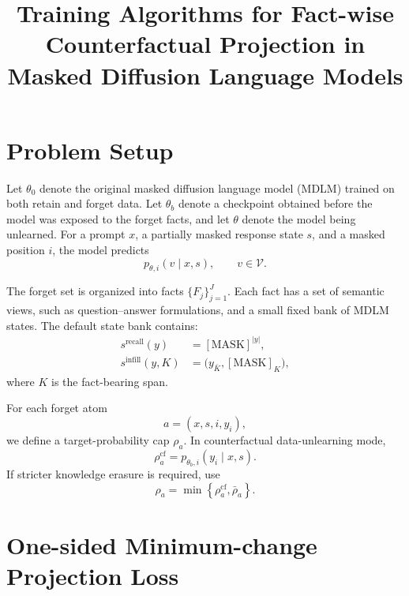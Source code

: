 \documentclass[11pt]{article}
\title{Training Algorithms for Fact-wise Counterfactual Projection in Masked Diffusion Language Models}
\author{}
\date{}
\newcommand{\V}{\mathcal{V}}
\begin{document}
\maketitle

\section{Problem Setup}

Let $\theta_0$ denote the original masked diffusion language model (MDLM) trained on both retain and forget data. Let $\theta_b$ denote a checkpoint obtained before the model was exposed to the forget facts, and let $\theta$ denote the model being unlearned. For a prompt $x$, a partially masked response state $s$, and a masked position $i$, the model predicts
\begin{equation}
    p_{\theta,i}(v\mid x,s), \qquad v\in\V.
\end{equation}

The forget set is organized into facts $\{F_j\}_{j=1}^{J}$. Each fact has a set of semantic views, such as question--answer formulations, and a small fixed bank of MDLM states. The default state bank contains:
\begin{align}
    s^{\mathrm{recall}}(y)
    &= [\mathrm{MASK}]^{|y|}, \\
    s^{\mathrm{infill}}(y,K)
    &= \bigl(y_{\bar K},[\mathrm{MASK}]_{K}\bigr),
\end{align}
where $K$ is the fact-bearing span.

For each forget atom
\begin{equation}
    a=(x,s,i,y_i),
\end{equation}
we define a target-probability cap $\rho_a$. In counterfactual data-unlearning mode,
\begin{equation}
    \rho_a^{\mathrm{cf}}
    = p_{\theta_b,i}(y_i\mid x,s).
\end{equation}
If stricter knowledge erasure is required, use
\begin{equation}
    \rho_a
    = \min\!\left\{\rho_a^{\mathrm{cf}},\bar\rho_a\right\}.
\end{equation}

\section{One-sided Minimum-change Projection Loss}
\end{document}

